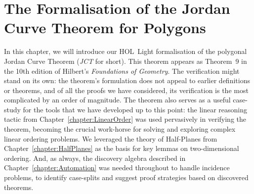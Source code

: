 \chapter{The Formalisation of the Jordan Curve Theorem for Polygons}\label{chapter:JordanFormalisation}\label{chapter:JordanVerification1}

In this chapter, we will introduce our HOL~Light formalisation of the polygonal Jordan Curve Theorem (\emph{JCT} for short). This theorem appears as Theorem~9 in the 10th edition of Hilbert's \emph{Foundations of Geometry}. The verification might stand on its own: the theorem's formulation does not appeal to earlier definitions or theorems, and of all the proofs we have considered, its verification is the most complicated by an order of magnitude. The theorem also serves as a useful case-study for the tools that we have developed up to this point: the linear reasoning tactic from Chapter~\ref{chapter:LinearOrder} was used pervasively in verifying the theorem, becoming the crucial work-horse for solving and exploring complex linear ordering problems. We leveraged the theory of Half-Planes from Chapter~\ref{chapter:HalfPlanes} as the basis for key lemmas on two-dimensional ordering. And, as always, the discovery algebra described in Chapter~\ref{chapter:Automation} was needed throughout to handle incidence problems, to identify case-splits and suggest proof strategies based on discovered theorems. 

